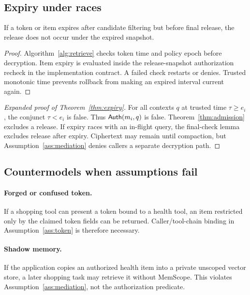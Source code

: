 \subsection{Expiry under races}

\begin{lemma}
If a token or item expires after candidate filtering but before final release, the release does not occur under the expired snapshot.
\end{lemma}
\begin{proof}
Algorithm~\ref{alg:retrieve} checks token time and policy epoch before decryption. Item expiry is evaluated inside the release-snapshot authorization recheck in the implementation contract. A failed check restarts or denies. Trusted monotonic time prevents rollback from making an expired interval current again.
\end{proof}

\begin{proof}[Expanded proof of Theorem~\ref{thm:expiry}]
For all contexts $q$ at trusted time $\tau\ge e_i$, the conjunct $\tau<e_i$ is false. Thus $\mathsf{Auth}(m_i,q)$ is false. Theorem~\ref{thm:admission} excludes a release. If expiry races with an in-flight query, the final-check lemma excludes release after expiry. Ciphertext may remain until compaction, but Assumption~\ref{ass:mediation} denies callers a separate decryption path.
\end{proof}

\subsection{Countermodels when assumptions fail}

\paragraph{Forged or confused token.}
If a shopping tool can present a token bound to a health tool, an item restricted only by the claimed token fields can be returned. Caller/tool-chain binding in Assumption~\ref{ass:token} is therefore necessary.

\paragraph{Shadow memory.}
If the application copies an authorized health item into a private unscoped vector store, a later shopping task may retrieve it without MemScope. This violates Assumption~\ref{ass:mediation}, not the authorization predicate.

